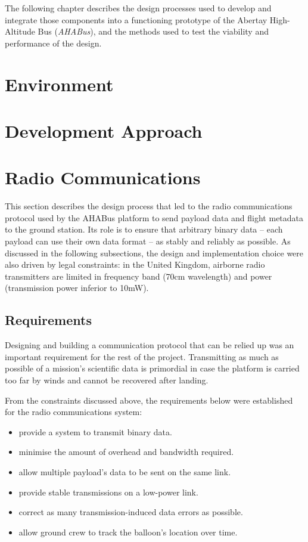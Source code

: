 The following chapter describes the design processes used to develop and
integrate those components into a functioning prototype of the Abertay
High-Altitude Bus (\textit{AHABus}), and the methods used to test the viability
and performance of the design.

\section{Environment}

\section{Development Approach}

\section{Radio Communications}
\label{sec:radio-coms}

This section describes the design process that led to the radio communications
protocol used by the AHABus platform to send payload data and flight metadata
to the ground station. Its role is to ensure that arbitrary binary data – each
payload can use their own data format – as stably and reliably as possible. As
discussed in the following subsections, the design and implementation choice
were also driven by legal constraints: in the United Kingdom, airborne radio
transmitters are limited in frequency band (70cm wavelength) and power
(transmission power inferior to 10mW).

\subsection{Requirements}
\label{ssec:requirements}

Designing and building a communication protocol that can be relied up was an
important requirement for the rest of the project. Transmitting as much as
possible of a mission's scientific data is primordial in case the platform
is carried too far by winds and cannot be recovered after landing.

From the constraints discussed above, the requirements below were established
for the radio communications system:

\begin{itemize}
\item provide a system to transmit binary data.%
\item minimise the amount of overhead and bandwidth required.%
\item allow multiple payload's data to be sent on the same link.%
\item provide stable transmissions on a low-power link.%
\item correct as many transmission-induced data errors as possible.%
\item allow ground crew to track the balloon's location over time.%
\end{itemize}

